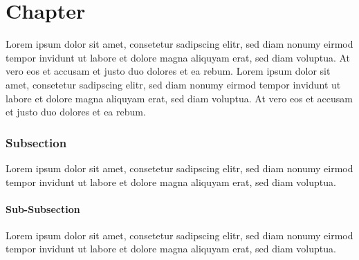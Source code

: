 \chapter{Chapter}
\label{ch:chapter}

Lorem ipsum dolor sit amet, consetetur sadipscing elitr, sed diam nonumy eirmod tempor invidunt ut labore et dolore magna aliquyam erat, sed diam voluptua. At vero eos et accusam et justo duo dolores et ea rebum. Lorem ipsum dolor sit amet, consetetur sadipscing elitr, sed diam nonumy eirmod tempor invidunt ut labore et dolore magna aliquyam erat, sed diam voluptua. At vero eos et accusam et justo duo dolores et ea rebum.

	
	
	
	
	
	
	
	
	

	

		\subsection{Subsection}
		\label{ssec:subsection}
		
		Lorem ipsum dolor sit amet, consetetur sadipscing elitr, sed diam nonumy eirmod tempor invidunt ut labore et dolore magna aliquyam erat, sed diam voluptua.
		
			\subsubsection{Sub-Subsection}
			\label{sssec:subsection}
			
			Lorem ipsum dolor sit amet, consetetur sadipscing elitr, sed diam nonumy eirmod tempor invidunt ut labore et dolore magna aliquyam erat, sed diam voluptua.
